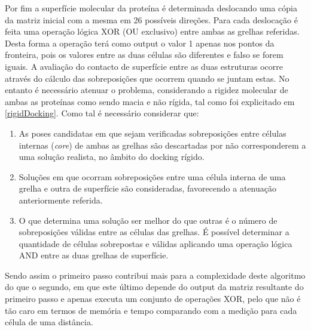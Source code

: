 Por fim a superfície molecular da proteína é determinada deslocando uma cópia da matriz inicial com a mesma em 26 possíveis direções. Para cada deslocação é feita uma operação lógica XOR (OU exclusivo) entre ambas as grelhas referidas. Desta forma a operação terá como output o valor 1 apenas nos pontos da fronteira, pois os valores entre as duas células são diferentes e falso se forem iguais.
A avaliação do contacto de superfície entre as duas estruturas ocorre através do cálculo das sobreposições que ocorrem quando se juntam estas. No entanto é necessário atenuar o problema, considerando a rigidez molecular de ambas as proteínas como sendo macia e não rígida, tal como foi explicitado em \ref{rigidDocking}. Como tal é necessário considerar que:
\begin{enumerate}

\item As poses candidatas em que sejam verificadas sobreposições entre células internas (\textit{core}) de ambas as grelhas são descartadas por não corresponderem a uma solução realista, no âmbito do docking rígido.

\item Soluções em que ocorram sobreposições entre uma célula interna de uma grelha e outra de superfície são consideradas, favorecendo a atenuação anteriormente referida.

\item O que determina uma solução ser melhor do que outras é o número de sobreposições válidas entre as células das grelhas. É possível determinar a quantidade de células sobrepostas e válidas aplicando uma operação lógica AND entre as duas grelhas de superfície.
\end{enumerate}

Sendo assim o primeiro passo contribui mais para a complexidade deste algoritmo do que o segundo, em que este último depende do output da matriz resultante do primeiro passo e apenas executa um conjunto de operações XOR, pelo que não é tão caro em termos de memória e tempo comparando com a medição para cada célula de uma distância.

